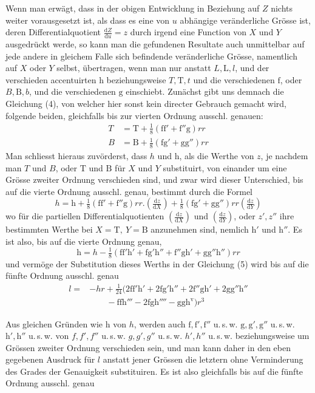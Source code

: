 %
\par\noindent\hspace*{\parindent} Wenn man erwägt, dass in der obigen Entwicklung in Beziehung auf \(Z\) nichts weiter vorausgesetzt ist, als dass es eine von \(u\) abhängige veränderliche Grösse ist, deren Differentialquotient \(\frac{\mathrm{d}Z}{\mathrm{d}u}=z\) durch irgend eine Function von \(X\) und \(Y\) ausgedrückt werde, so kann man die gefundenen Resultate auch unmittelbar auf jede andere in gleichem Falle sich befindende veränderliche Grösse, namentlich auf \(X\) oder \(Y\) selbst, übertragen, wenn man nur anstatt \(L,\mathrm{L},l\), und der verschieden accentuirten \(\mathrm{h}\) beziehungsweise \(T,\mathrm{T},t\) und die verschiedenen \(\mathrm{f}\), oder \(B,\mathrm{B},b\), und die verschiedenen \(\mathrm{g}\) einschiebt. Zunächst gibt uns demnach die Gleichung (4), von welcher hier sonst kein directer Gebrauch gemacht wird, folgende beiden, gleichfalls bis zur vierten Ordnung ausschl. genauen:
\[
\begin{aligned}
T&=\mathrm{T}+\tfrac18(\mathrm{ff}'+\mathrm{f}''\mathrm{g})rr\\
B&=\mathrm{B}+\tfrac18(\mathrm{fg}'+\mathrm{gg}'')rr
\end{aligned}
\]
Man schliesst hieraus zuvörderst, dass \(h\) und \(\mathrm{h}\), als die Werthe von \(z\), je nachdem man \(T\) und \(B\), oder \(\mathrm{T}\) und \(\mathrm{B}\) für \(X\) und \(Y\) substituirt, von einander um eine Grösse zweiter Ordnung verschieden sind, und zwar wird dieser Unterschied, bis auf die vierte Ordnung ausschl. genau, bestimmt durch die Formel
\[
h=\mathrm{h}+\tfrac18(\mathrm{ff}'+\mathrm{f}''\mathrm{g})rr\mathord{.}(\tfrac{\mathrm{d}z}{\mathrm{d}X})+\tfrac18(\mathrm{fg}'+\mathrm{gg}'')rr(\tfrac{\mathrm{d}z}{\mathrm{d}Y})
\]
wo für die partiellen Differentialquotienten \((\frac{\mathrm{d}z}{\mathrm{d}X})\) und \((\frac{\mathrm{d}z}{\mathrm{d}Y})\), oder \(z',z''\) ihre bestimmten Werthe bei \(X=\mathrm{T},\ Y=\mathrm{B}\) anzunehmen sind, nemlich \(\mathrm{h}'\) und \(\mathrm{h}''\). Es ist also, bis auf die vierte Ordnung genau,
\[
\mathrm{h}=h-\tfrac18(\mathrm{ff'h}'+\mathrm{fg'h}''+\mathrm{f''gh}'+\mathrm{gg''h}'')rr
\]
und vermöge der Substitution dieses Werths in der Gleichung (5) wird bis auf die fünfte Ordnung ausschl. genau
\[
\begin{aligned}
l={}&-hr+\tfrac1{24}(2\mathrm{ff'h}'+2\mathrm{fg'h}''+2\mathrm{f''gh}'+2\mathrm{gg''h}''\\
&\qquad-\mathrm{ffh}'''-2\mathrm{fgh}''''-\mathrm{ggh}^{\mathrm{v}})r^3
\end{aligned}
\]

\indent Aus gleichen Gründen wie \(\mathrm{h}\) von \(h\), werden auch \(\mathrm{f},\mathrm{f}',\mathrm{f}''\) u.\,s.\,w. \(\mathrm{g},\mathrm{g}',\mathrm{g}''\) u.\,s.\,w. \(\mathrm{h}',\mathrm{h}''\) u.\,s.\,w. von \(f,f',f''\) u.\,s.\,w. \(g,g',g''\) u.\,s.\,w. \(h',h''\) u.\,s.\,w. beziehungsweise um Grössen zweiter Ordnung verschieden sein, und man kann daher in den eben gegebenen Ausdruck für \(l\) anstatt jener Grössen die letztern ohne Verminderung des Grades der Genauigkeit substituiren. Es ist also gleichfalls bis auf die fünfte Ordnung ausschl. genau

